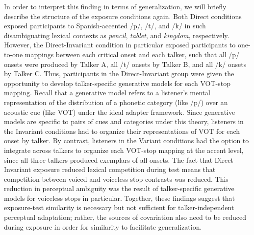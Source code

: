 \documentclass[
  12pt,
  twoside]{article}
\begin{document}
In order to interpret this finding in terms of generalization, we will briefly describe the structure of the exposure conditions again.
Both Direct conditions exposed participants to Spanish-accented /p/, /t/, and /k/ in such disambiguating lexical contexts as \emph{pencil}, \emph{tablet}, and \emph{kingdom}, respectively.
However, the Direct-Invariant condition in particular exposed participants to one-to-one mappings between each critical onset and each talker, such that all /p/ onsets were produced by Talker A, all /t/ onsets by Talker B, and all /k/ onsets by Talker C.
Thus, participants in the Direct-Invariant group were given the opportunity to develop talker-specific generative models for each VOT-stop mapping.
Recall that a generative model refers to a listener's mental representation of the distribution of a phonetic category (like /p/) over an acoustic cue (like VOT) under the ideal adapter framework.
Since generative models are specific to pairs of cues and categories under this theory, listeners in the Invariant conditions had to organize their representations of VOT for each onset by talker.
By contrast, listeners in the Variant conditions had the option to integrate across talkers to organize each VOT-stop mapping at the accent level, since all three talkers produced exemplars of all onsets.
The fact that Direct-Invariant exposure reduced lexical competition during test means that competition between voiced and voiceless stop contrasts was reduced.
This reduction in perceptual ambiguity was the result of talker-specific generative models for voiceless stops in particular.
Together, these findings suggest that exposure-test similarity is necessary but not sufficient for talker-independent perceptual adaptation; rather, the sources of covariation also need to be reduced during exposure in order for similarity to facilitate generalization.
\end{document}
